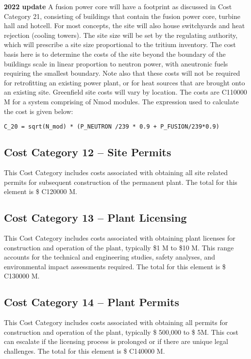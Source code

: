  \textbf{2022 update} 
A fusion power core will have a footprint as discussed in Cost Category 21, consisting of buildings that contain the fusion power core, turbine hall and hotcell. For most concepts, the site will also house switchyards and heat rejection (cooling towers). The site size will be set by the regulating authority, which will prescribe a site size proportional to the tritium inventory.  The cost basis here is to determine the costs of the site beyond the boundary of the buildings scale in linear proportion to neutron power, with aneutronic fuels requiring the smallest boundary.  Note also that these costs will not be required for retrofitting an existing power plant, or for heat sources that are brought onto an existing site.  Greenfield site costs will vary by location. The costs are C110000 M for a system comprising of Nmod modules. 
 The expression used to calculate the cost is given below: 
\begin{verbatim} 
C_20 = sqrt(N_mod) * (P_NEUTRON /239 * 0.9 + P_FUSION/239*0.9)\end{verbatim} 


\subsection*{Cost Category 12 – Site Permits} 
This Cost Category includes costs associated with obtaining all site related permits for subsequent construction of the permanent plant.  The total for this element is \$ C120000 M.

\subsection*{Cost Category 13 – Plant Licensing} 
This Cost Category includes costs associated with obtaining plant licenses for construction and operation of the plant, typically \$1 M to \$10 M. This range accounts for the technical and engineering studies, safety analyses, and environmental impact assessments required.  The total for this element is \$ C130000 M.

\subsection*{Cost Category 14 – Plant Permits} 
This Cost Category includes costs associated with obtaining all permits for construction and operation of the plant, typically \$ 500,000 to \$ 5M. This cost can escalate if the licensing process is prolonged or if there are unique legal challenges.  The total for this element is \$ C140000 M.

